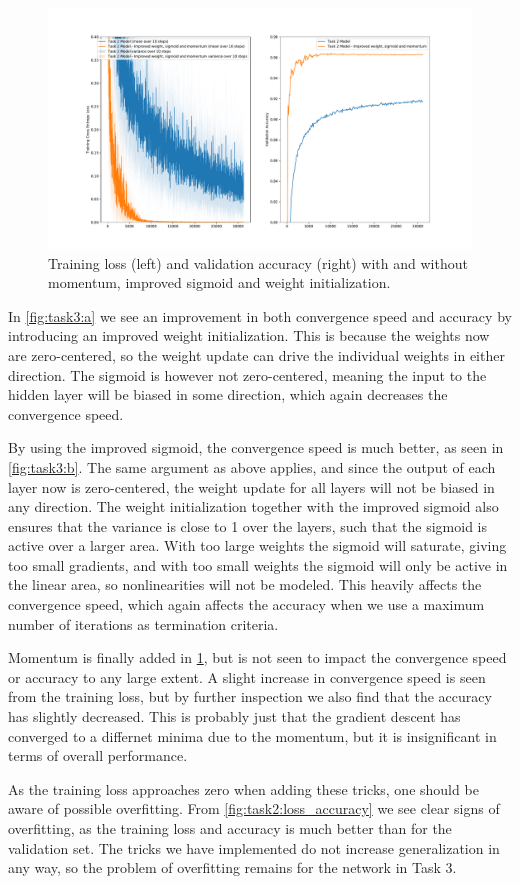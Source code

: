 \begin{figure}[h!]
  \centering
  \includegraphics[clip, trim=3cm 1cm 3cm 1cm, width=\textwidth]{figures/Task3c.pdf}
  \caption{Training loss (left) and validation accuracy (right) with and without momentum, improved sigmoid and weight initialization.}
  \label{fig:task3:c}
\end{figure}

In \cref{fig:task3:a} we see an improvement in both convergence speed and accuracy by introducing an improved weight initialization. This is because the weights now are zero-centered, so the weight update can drive the individual weights in either direction. The sigmoid is however not zero-centered, meaning the input to the hidden layer will be biased in some direction, which again decreases the convergence speed.

By using the improved sigmoid, the convergence speed is much better, as seen in \cref{fig:task3:b}. The same argument as above applies, and since the output of each layer now is zero-centered, the weight update for all layers will not be biased in any direction. The weight initialization together with the improved sigmoid also ensures that the variance is close to 1 over the layers, such that the sigmoid is active over a larger area. With too large weights the sigmoid will saturate, giving too small gradients, and with too small weights the sigmoid will only be active in the linear area, so nonlinearities will not be modeled. This heavily affects the convergence speed, which again affects the accuracy when we use a maximum number of iterations as termination criteria.

Momentum is finally added in \cref{fig:task3:c}, but is not seen to impact the convergence speed or accuracy to any large extent. A slight increase in convergence speed is seen from the training loss, but by further inspection we also find that the accuracy has slightly decreased. This is probably just that the gradient descent has converged to a differnet minima due to the momentum, but it is insignificant in terms of overall performance.

As the training loss approaches zero when adding these tricks, one should be aware of possible overfitting. From \cref{fig:task2:loss_accuracy} we see clear signs of overfitting, as the training loss and accuracy is much better than for the validation set. The tricks we have implemented do not increase generalization in any way, so the problem of overfitting remains for the network in Task 3.
